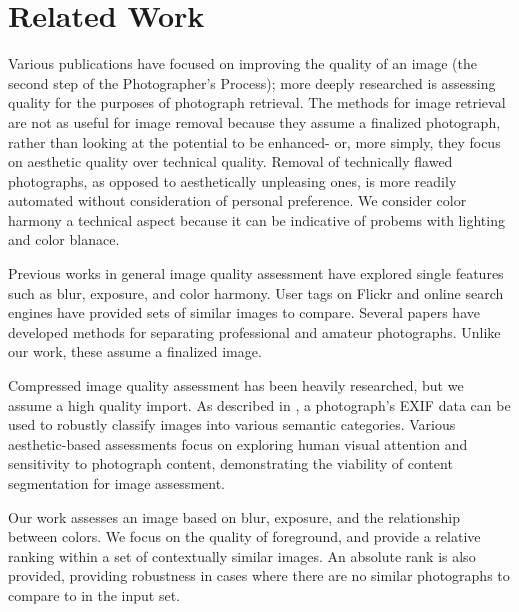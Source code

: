 \documentclass[twocolumn]{article}
\begin{document}
\section{Related Work}
Various publications have focused on improving the quality of an image (the second step of the Photographer's Process)\cite{Bhattacahrya:2010:FPA:1873951.1873990}\cite{Kopf:2008:DPM:1409060.1409069}; more deeply researched is assessing quality for the purposes of photograph retrieval\cite{Yeh:2010:PPR:1873951.1873963}\cite{vanZwol:2010:FEI:1772690.1772788}\cite{springerlink:10.1007/978-3-642-17187-1_57}\cite{Cui:2008:RTG:1459359.1459471}\cite{Chu2010256}. The methods for image retrieval are not as useful for image removal because they assume a finalized photograph, rather than looking at the potential to be enhanced- or, more simply, they focus on aesthetic quality over technical quality. Removal of technically flawed photographs, as opposed to aesthetically unpleasing ones, is more readily automated without consideration of personal preference. We consider color harmony a technical aspect because it can be indicative of probems with lighting and color blanace.

Previous works in general image quality assessment have explored single features such as blur\cite{springerlink:10.1007/978-3-540-77409-9_26}, exposure\cite{5540170}, and color harmony\cite{COL:COL5080160410}\cite{COL:COL10004}. User tags on Flickr and online search engines have provided sets of similar images to compare\cite{Berg:EECS-2007-13}\cite{Chu2010256}. Several papers have developed methods for separating professional and amateur photographs\cite{springerlink:10.1007/978-3-540-30541-5_25}\cite{springerlink:10.1007/11744078_23}\cite{1640788}\cite{springerlink:10.1007/978-3-540-88690-7_29}. Unlike our work, these assume a finalized image.

Compressed image quality assessment has been heavily researched\cite{477498}\cite{1038064}\cite{1284395}, but we assume a high quality import. As described in \cite{1315222}, a photograph's EXIF data can be used to robustly classify images into various semantic categories. Various aesthetic-based assessments focus on exploring human visual attention and sensitivity to photograph content\cite{Sun:2009:PAB:1631272.1631351}\cite{1518955}\cite{Pimenov_fastimage}, demonstrating the viability of content segmentation for image assessment.

Our work assesses an image based on blur, exposure, and the relationship between colors. We focus on the quality of foreground, and provide a relative ranking within a set of contextually similar images. An absolute rank is also provided, providing robustness in cases where there are no similar photographs to compare to in the input set.
\end{document}
